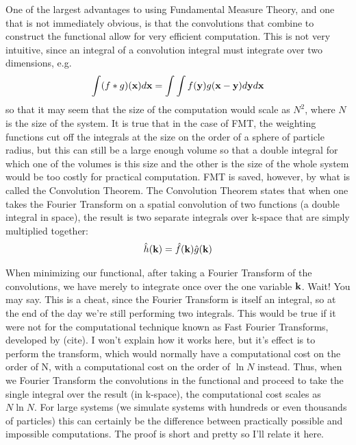 One of the largest advantages to using Fundamental
Measure Theory, and one that is not immediately obvious, is that the
convolutions that combine to construct the functional allow for very
efficient computation.  This is not very intuitive, since an integral
of a convolution integral must integrate over two dimensions, e.g.
\begin{align}
\int(f\ast g)(\textbf{x})d\textbf{x} = \int \int f(\textbf{y})g(\textbf{x}-\textbf{y})d\textbf{y} d\textbf{x}
\end{align}
so that it may seem that the size of the computation would scale as
$N^2$, where $N$ is the size of the system.  It is true that in the
case of FMT, the weighting functions cut off the integrals at the size
on the order of a sphere of particle radius, but this can still be a
large enough volume so that a double integral for which one of the
volumes is this size and the other is the size of the whole system
would be too costly for practical computation.  FMT is saved, however,
by what is called the Convolution Theorem.  The Convolution Theorem
states that when one takes the Fourier Transform on a spatial
convolution of two functions (a double integral in space), the result
is two separate integrals over k-space that are simply multiplied
together:
\begin{align}
\hat{h}(\textbf{k}) = \hat{f}(\textbf{k})\hat{g}(\textbf{k})
\end{align}

When minimizing our functional, after
taking a Fourier Transform of the convolutions, we have merely to
integrate once over the one variable $\textbf{k}$.  Wait!  You may say.  This
is a cheat, since the Fourier Transform is itself an integral, so at
the end of the day we're still performing two integrals.  This would
be true if it were not for the computational technique known as Fast
Fourier Transforms, developed by (cite).  I won't explain how it works
here, but it's effect is to perform the transform, which would
normally have a computational cost on the order of N, with a
computational cost on the order of $\ln N$ instead.  Thus, when we
Fourier Transform the convolutions in the functional and proceed to
take the single integral over the result (in k-space), the
computational cost scales as $N \ln N$.  For large systems (we
simulate systems with hundreds or even thousands of particles) this
can certainly be the difference between practically possible and
impossible computations.  The proof is short and pretty so I'll relate
it here.

